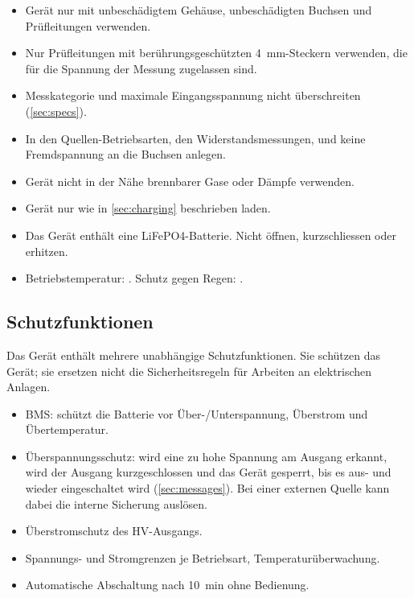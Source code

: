 \begin{warning}
    \begin{itemize}
        \item Gerät nur mit unbeschädigtem Gehäuse, unbeschädigten Buchsen und Prüfleitungen verwenden.
        \item Nur Prüfleitungen mit berührungsgeschützten \qty{4}{\milli\meter}-Steckern verwenden, die für die Spannung der Messung zugelassen sind.
        \item Messkategorie und maximale Eingangsspannung nicht überschreiten (\autoref{sec:specs}).
        \item In den Quellen-Betriebsarten, den Widerstandsmessungen,  und
               keine Fremdspannung an die Buchsen anlegen.
        \item Gerät nicht in der Nähe brennbarer Gase oder Dämpfe verwenden.
    \end{itemize}
\end{warning}

\begin{caution}
    \begin{itemize}
        \item Gerät nur wie in \autoref{sec:charging} beschrieben laden.
        \item Das Gerät enthält eine \ac{LiFePO4}-Batterie. Nicht öffnen, kurzschliessen oder erhitzen.
        \item Betriebstemperatur: . Schutz gegen Regen: .
    \end{itemize}
\end{caution}

\subsection{Schutzfunktionen}
Das Gerät enthält mehrere unabhängige Schutzfunktionen. Sie schützen das Gerät; sie ersetzen
nicht die Sicherheitsregeln für Arbeiten an elektrischen Anlagen.
\begin{itemize}
    \item \ac{BMS}: schützt die Batterie vor Über-/Unterspannung, Überstrom und Übertemperatur.
    \item Überspannungsschutz: wird eine zu hohe Spannung am Ausgang erkannt, wird der Ausgang
          kurzgeschlossen und das Gerät gesperrt, bis es aus- und wieder eingeschaltet wird
          (\autoref{sec:messages}). Bei einer externen Quelle kann dabei die interne Sicherung auslösen.
    \item Überstromschutz des \ac{HV}-Ausgangs.
    \item Spannungs- und Stromgrenzen je Betriebsart, Temperaturüberwachung.
    \item Automatische Abschaltung nach \qty{10}{\minute} ohne Bedienung.
\end{itemize}
